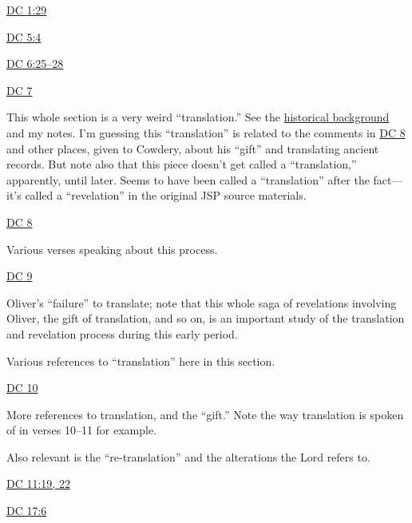 		\begin{compactdesc}
			\item[{\hyperref[DC1-29]{DC 1:29}}]
			\item[{\hyperref[DC5-4]{DC 5:4}}] 
			\item[{\hyperref[DC6-25]{DC 6:25--28}}] 
			\item[{\hyperref[DC7]{DC 7}}] 
				\begin{compactitem}
					\item This whole section is a very weird ``translation.'' See the \hyperref[DC7-HB]{historical background} and my notes. I'm guessing this ``translation'' is related to the comments in \hyperref[DC8]{DC 8} and other places, given to Cowdery, about his ``gift'' and translating ancient records. But note also that this piece doesn't get called a ``translation,'' apparently, until later. Seems to have been called a ``translation'' after the fact---it's called a ``revelation'' in the original JSP source materials.
				\end{compactitem}
			\item[{\hyperref[DC8]{DC 8}}]
				\begin{compactitem}
					\item Various verses speaking about this process.
				\end{compactitem}
			\item[{\hyperref[DC9]{DC 9}}]
				\begin{compactitem}
					\item Oliver's ``failure'' to translate; note that this whole saga of revelations involving Oliver, the gift of translation, and so on, is an important study of the translation and revelation process during this early period.
					\item Various references to ``translation'' here in this section.
				\end{compactitem}
			\item[{\hyperref[DC10]{DC 10}}]
				\begin{compactitem}
					\item More references to translation, and the ``gift.'' Note the way translation is spoken of in verses 10--11 for example.
					\item Also relevant is the ``re-translation'' and the alterations the Lord refers to.
				\end{compactitem}
			\item[{\hyperref[DC11-19]{DC 11:19, 22}}] 
			\item[{\hyperref[DC17-6]{DC 17:6}}] 

\end{compactdesc}

